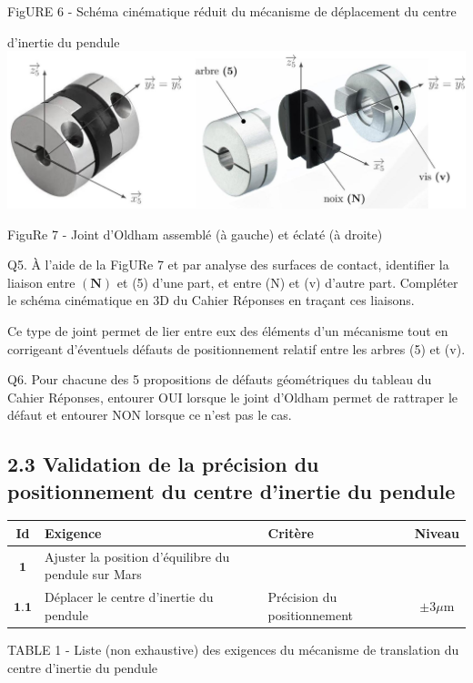 \documentclass[10pt]{article}
\begin{document}
FigURE 6 - Schéma cinématique réduit du mécanisme de déplacement du centre

d'inertie du pendule\\
\includegraphics[max width=\textwidth, center]{2024_04_26_3285cfc264024262add0g-06}

FiguRe 7 - Joint d'Oldham assemblé (à gauche) et éclaté (à droite)

Q5. À l'aide de la FigURe 7 et par analyse des surfaces de contact, identifier la liaison entre $(\mathbf{N})$ et (5) d'une part, et entre (N) et (v) d'autre part. Compléter le schéma cinématique en 3D du Cahier Réponses en traçant ces liaisons.

Ce type de joint permet de lier entre eux des éléments d'un mécanisme tout en corrigeant d'éventuels défauts de positionnement relatif entre les arbres (5) et (v).

Q6. Pour chacune des 5 propositions de défauts géométriques du tableau du Cahier Réponses, entourer OUI lorsque le joint d'Oldham permet de rattraper le défaut et entourer NON lorsque ce n'est pas le cas.

\subsection*{2.3 Validation de la précision du positionnement du centre d'inertie du pendule}
\begin{center}
\begin{tabular}{|c|l|l|c|}
\hline
Id & Exigence & Critère & Niveau \\
\hline
$\mathbf{1}$ & Ajuster la position d'équilibre du pendule sur Mars &  &  \\
\hline
$\mathbf{1 . 1}$ & Déplacer le centre d'inertie du pendule & Précision du positionnement & $\pm 3 \mu \mathrm{m}$ \\
\hline
\end{tabular}
\end{center}

TABLE 1 - Liste (non exhaustive) des exigences du mécanisme de translation du centre d'inertie du pendule
\end{document}
